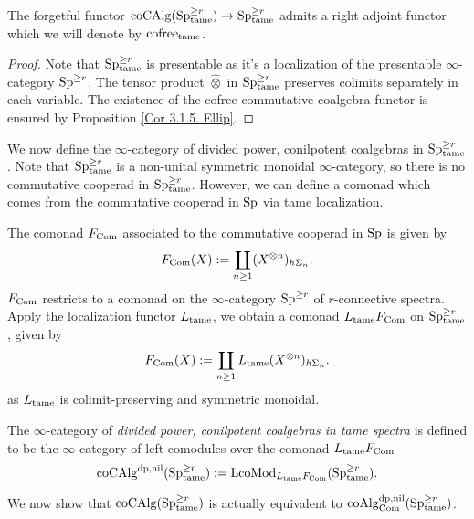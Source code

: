 \begin{corollary}
The forgetful functor $\coCAlg(\Sp_{\tame}^{\geq r})\to \Sp^{\geq r}_{\tame}$ admits a right adjoint functor which we will denote by $\cofree_{\tame}$.
\end{corollary}
\begin{proof}
	 Note that $\Sp^{\geq r}_{\tame}$ is presentable as it's a localization of the presentable $\infty$-category $\Sp^{\geq r}$. The tensor product $\hat{\otimes}$ in $\Sp_{\tame}^{\geq r}$ preserves colimits separately in each variable. The existence of the cofree commutative coalgebra functor is ensured by Proposition \ref{Cor 3.1.5. Ellip}.
\end{proof}

We now define the $\infty$-category of divided power, conilpotent coalgebras in $\Sp_{\tame}^{\geq r}$. Note that $\Sp_{\tame}^{\geq r}$ is a non-unital symmetric monoidal $\infty$-category, so there is no commutative cooperad in $\Sp_{\tame}^{\geq r}$. However, we can define a comonad which comes from the commutative cooperad in $\Sp$ via tame localization.

The comonad $F_{\Com}$ associated to the commutative cooperad in $\Sp$ is given by
$$
F_{\Com}(X) := \coprod_{n\geq 1} (X^{\otimes n})_{h\Sigma_n}.
$$
$F_{\Com}$ restricts to a comonad on the $\infty$-category $\Sp^{\geq r}$ of $r$-connective spectra.
Apply the localization functor $L_{\tame}$, we obtain a comonad $L_{\tame}F_{\Com}$ on $\Sp_{\tame}^{\geq r}$, given by 
$$
F_{\Com}(X) := \coprod_{n\geq 1} L_{\tame}(X^{\otimes n})_{h\Sigma_n}.
$$
as $L_{\tame}$ is colimit-preserving and symmetric monoidal.
\begin{definition}
    The $\infty$-category of \emph{divided power, conilpotent coalgebras in tame spectra} is defined to be the $\infty$-category of left comodules over the comonad $L_{\tame}F_{\Com}$
    \[
    \coCAlg^{\divpow, \nil}(\Sp_{\tame}^{\geq r}):= \operatorname{LcoMod}_{L_{\tame}F_{\Com}}(\Sp_{\tame}^{\geq r}).
    \]
\end{definition}




We now show that $\coCAlg(\Sp_{\tame}^{\geq r})$ is actually equivalent to $\coAlg^{\divpow, \nil}_{\Com}(\Sp_{\tame}^{\geq r})$.

